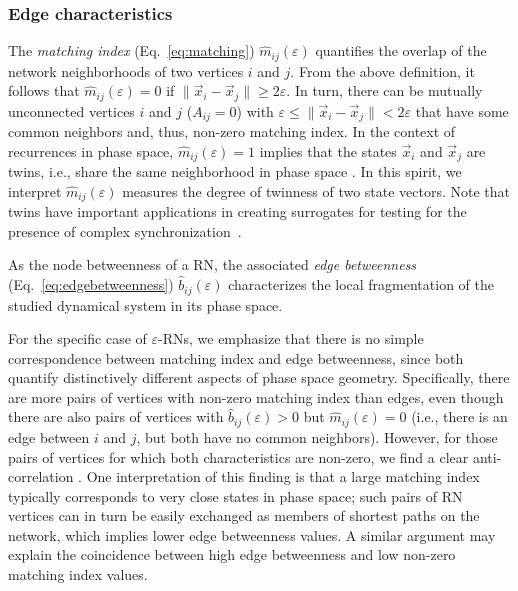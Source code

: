   		\subsubsection{Edge characteristics}
		The \textit{matching index} (Eq.~\ref{eq:matching}) $\hat{m}_{ij}(\varepsilon)$ quantifies the overlap of the network neighborhoods of two vertices $i$ and $j$. From the above definition, it follows that $\hat{m}_{ij}(\varepsilon)=0$ if $\|\vec{x}_i-\vec{x}_j\|\geq 2\varepsilon$. In turn, there can be mutually unconnected vertices $i$ and $j$ ($A_{ij}=0$) with $\varepsilon\leq \|\vec{x}_i-\vec{x}_j\|< 2\varepsilon$ that have some common neighbors and, thus, non-zero matching index. In the context of recurrences in phase space, $\hat{m}_{ij}(\varepsilon)=1$ implies that the states $\vec{x}_i$ and $\vec{x}_j$ are twins, i.e., share the same neighborhood in phase space \cite{thiel2006b}. In this spirit, we interpret $\hat{m}_{ij}(\varepsilon)$ measures the degree of twinness of two state vectors. Note that twins have important applications in creating surrogates for testing for the presence of complex synchronization~\cite{thiel2006b,Romano2009}.

		As the node betweenness of a RN, the associated \textit{edge betweenness} (Eq.~\ref{eq:edgebetweenness}) $\hat{b}_{ij}(\varepsilon)$ characterizes the local fragmentation of the studied dynamical system in its phase space.

		For the specific case of $\varepsilon$-RNs, we emphasize that there is no simple correspondence between matching index and edge betweenness, since both quantify distinctively different aspects of phase space geometry. Specifically, there are more pairs of vertices with non-zero matching index than edges, even though there are also pairs of vertices with $\hat{b}_{ij}(\varepsilon)>0$ but $\hat{m}_{ij}(\varepsilon)=0$ (i.e., there is an edge between $i$ and $j$, but both have no common neighbors). However, for those pairs of vertices for which both characteristics are non-zero, we find a clear anti-correlation \cite{Donner2010a}. One interpretation of this finding is that a large matching index typically corresponds to very close states in phase space; such pairs of RN vertices can in turn be easily exchanged as members of shortest paths on the network, which implies lower edge betweenness values. A similar argument may explain the coincidence between high edge betweenness and low non-zero matching index values.

